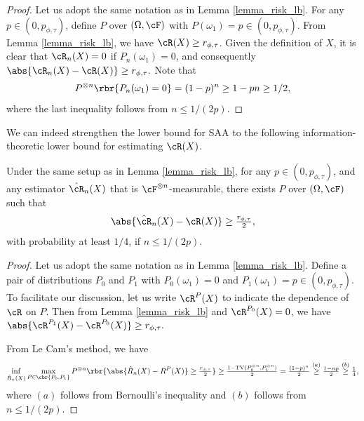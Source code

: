 \documentclass[9pt]{article} %
\numberwithin{equation}{section}
\renewcommand{\frac}[2]{\tfrac{#1}{#2}}
\begin{document}
\begin{proof}
Let us adopt the same notation as in Lemma \ref{lemma_risk_lb}.
For any $p \in (0,  p_{\phi, \tau})$, define $P$ over $(\Omega, \cF)$ with 
$P(\omega_1) = p \in (0,  p_{\phi, \tau})$.
From Lemma \ref{lemma_risk_lb}, we have $\cR(X) \geq r_{\phi ,\tau}$. 
Given the definition of $X$, it is clear that $\cR_n(X) = 0$ if $P_n(\omega_1) = 0$,
and consequently 
$
\abs{{\cR}_n (X) - \cR(X) } \geq {r_{\phi, \tau}}.
$
Note that 
\begin{align*}
P^{\otimes n} \rbr{ P_n(\omega_1) = 0 } = (1-p)^n \geq 1- p n \geq 1/2,
\end{align*}
where the last inequality follows from $n \leq 1/(2p)$. 
\end{proof}


We can indeed strengthen the lower bound for SAA to the following information-theoretic lower bound for estimating $\cR(X)$. 

\begin{theorem}\label{info_lb_sublinear}
Under the same setup as in Lemma \ref{lemma_risk_lb}, for any $p \in (0,  p_{\phi, \tau})$,  and any estimator $\hat{\cR}_n(X)$ that is $\cF^{\otimes n}$-measurable,
there exists $P$ over $(\Omega, \cF)$ such that 
\begin{align*}
\abs{\hat{\cR}_n (X) - \cR(X) } \geq \frac{r_{\phi, \tau}}{2},
\end{align*}
with probability at least $1/4$, 
if $n \leq 1/(2 p)$.
\end{theorem}

\begin{proof}
Let us adopt the same notation as in Lemma \ref{lemma_risk_lb}.
Define a pair of distributions $P_0$ and $P_1$ with
$P_0(\omega_1) = 0$ and $P_1(\omega_1) = p \in (0,  p_{\phi, \tau})$.
To facilitate our discussion, let us write $\cR^P(X)$ to indicate the dependence of $\cR$ on $P$.
Then from Lemma \ref{lemma_risk_lb} and $\cR^{P_0}(X) = 0$, we have 
$
\abs{\cR^{P_1}(X) - \cR^{P_0}(X)} \geq  r_{\phi, \tau}.
$

From Le Cam's method, we have 
\begin{align*}
\inf_{\hat{R}_n (X) } \max_{P \in \cbr{P_0, P_1} } P^{\otimes n} \rbr{
\abs{\hat{R}_n (X) - R^P(X)} \geq \frac{r_{\phi, \tau}}{2}  
}
\geq 
\frac{1 - \mathrm{TV}(P_0^{\otimes n}, P_1^{\otimes n}) }{2}
= \frac{(1-p)^n}{2}
\overset{(a)}{\geq} \frac{1 - n p}{2}
\overset{(b)}{\geq} \frac{1}{4}
,
\end{align*}
where $(a)$ follows from Bernoulli's inequality and $(b)$ follows from $n \leq 1/(2 p)$. 
\end{proof}
\end{document}
